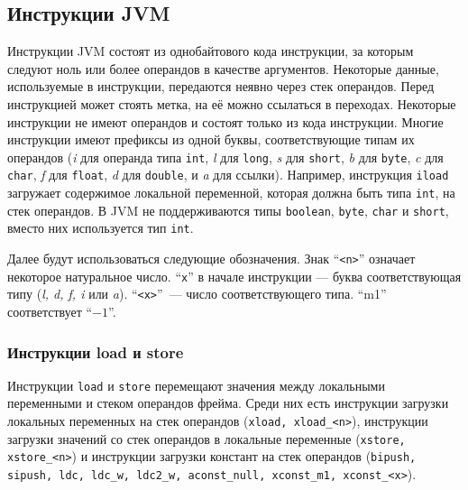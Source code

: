 \documentclass[14pt]{extarticle}
\begin{document}

\subsection{Инструкции JVM}
Инструкции JVM состоят из однобайтового кода инструкции, за которым следуют ноль или более операндов в качестве аргументов. Некоторые данные, используемые в инструкции, передаются неявно через стек операндов. Перед инструкцией может стоять метка, на её можно ссылаться в переходах. Некоторые инструкции не имеют операндов и состоят только из кода инструкции. Многие инструкции имеют префиксы из одной буквы, соответствующие типам их операндов ({\it i} для операнда типа \texttt{int}, {\it l} для \texttt{long}, {\it s} для \texttt{short}, {\it b} для \texttt{byte}, {\it c} для \texttt{char}, {\it f} для \texttt{float}, {\it d} для \texttt{double}, и {\it a} для ссылки). Например, инструкция \texttt{iload} загружает содержимое локальной переменной, которая должна быть типа \texttt{int}, на стек операндов. В JVM не поддерживаются типы \texttt{boolean}, \texttt{byte}, \texttt{char} и \texttt{short}, вместо них используется тип \texttt{int}. 


Далее будут использоваться следующие обозначения. Знак ``\texttt{<n>}'' \space означает некоторое натуральное число. ``\texttt{x}'' \space в начале инструкции --- буква соответствующая типу (\textit{l, d, f, i} или \textit{a}). ``\texttt{<x>}''~--- число соответствующего типа. ``m1'' соответствует ``$-1$''.

\subsubsection*{Инструкции load и store}
Инструкции \texttt{load} и \texttt{store} перемещают значения между локальными переменными и стеком операндов фрейма. Среди них есть инструкции загрузки локальных переменных на стек операндов (\texttt{xload, xload\_<n>}), инструкции загрузки значений со стек операндов в локальные переменные (\texttt{xstore, xstore\_<n>}) и инструкции загрузки констант на стек операндов (\texttt{bipush, sipush, ldc, ldc\_w, ldc2\_w, aconst\_null, xconst\_m1, xconst\_<x>}). 
\end{document}
